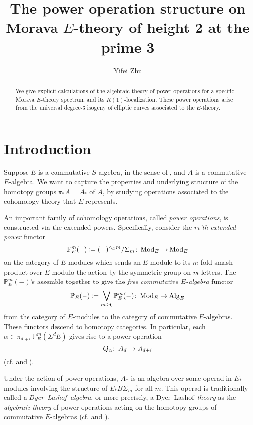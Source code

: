 \documentclass{gtpart}
\title{The power operation structure on Morava $E$-theory of height 2 at the prime 3}
\author{Yifei Zhu}
\theoremstyle{definition}
\theoremstyle{remark}
\def\co{\colon\thinspace}
\newcommand{\mb}[1]{\mathbb{#1}}
\newcommand{\Mod}{{\rm Mod}}
\newcommand{\Alg}{{\rm Alg}}
\newcommand{\cf}{cf.\thinspace}
\newcommand{\DL}{Dyer--Lashof~}
\newcommand{\BP}{{\mb P}}
\newcommand{\A}{\alpha}
\begin{document}
\begin{abstract}
 We give explicit calculations of the algebraic theory of power operations for a specific Morava $E$-theory spectrum and its $K(1)$-localization.  
 These power operations arise from the universal degree-3 isogeny of elliptic curves associated to the $E$-theory.  
\end{abstract}


\maketitle
\section{Introduction}

Suppose $E$ is a commutative $S$-algebra, in the sense of \cite{EKMM}, and $A$ is a commutative $E$-algebra.  
We want to capture the properties and underlying structure of the homotopy groups $\pi_* A = A_*$ of $A$, 
by studying operations associated to the cohomology theory that $E$ represents.  

An important family of cohomology operations, called {\em power operations}, is constructed via the extended powers.  
Specifically, consider the {\em $m$'th extended power} functor 
\[
 \BP_E^m (-) \coloneqq (-)^{\wedge_E m} / \Sigma_m \co \Mod_E \to \Mod_E 
\]
on the category of $E$-modules which sends an $E$-module to its $m$-fold smash product over $E$ modulo the action by the symmetric group on $m$ letters.  
The $\BP_E^m (-)$'s assemble together to give the {\em free commutative $E$-algebra} functor 
\[
 \BP_E (-) \coloneqq \bigvee_{m \geq 0} \BP_E^m (-) \co \Mod_E \to \Alg_E 
\]
from the category of $E$-modules to the category of commutative $E$-algebras.  
These functors descend to homotopy categories.  
In particular, each $\A \in \pi_{d+i}~\BP_E^m (\Sigma^d E)$ gives rise to a power operation 
\[
 Q_\A \co A_d \to A_{d+i} 
\]
(\cf \cite[Sections I.2 and IX.1]{H_infty} and \cite[Section 3]{cong}).  

Under the action of power operations, $A_*$ is an algebra over some operad in $E_*$-modules involving the structure of $E_* B\Sigma_m$ for all $m$.  
This operad is traditionally called a {\em \DL algebra}, or more precisely, 
a \DL {\em theory} as the {\em algebraic theory} of power operations acting on the homotopy groups of commutative $E$-algebras 
(\cf \cite[Chapters III, VIII, and IX]{H_infty} and \cite[Section 9]{lpo}).  
\end{document}
